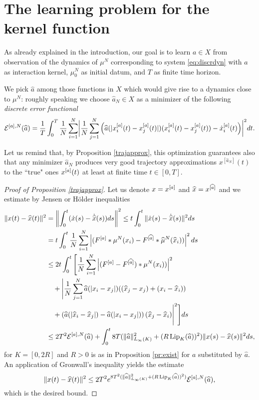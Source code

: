 
\section{The learning problem for the kernel function}\label{sec:learn}

As already explained in the introduction, our goal is to learn $a \in X$ from observation of the dynamics of $\mu^N$ corresponding to system \eqref{eq:discrdyn} with $a$ as interaction kernel, $\mu_0^N$ as initial datum, and $T$ as finite time horizon.

We pick $\widehat a$ among those functions in $X$ which would give rise to a dynamics close to $\mu^N$: roughly speaking we choose $\widehat a_N \in X$ as a minimizer of the following \textit{discrete error functional}
\begin{align}\label{eq-def-error}
	\begin{split}
	\mathcal E^{[a],N}(\widehat a) = \frac{1}{T}\int_0^T\frac{1}{N}\sum_{i=1}^N\biggl|\frac{1}{N}\sum_{j=1}^N
			\left(\widehat a(|x^{[a]}_i(t)-x^{[a]}_j(t)|)(x^{[a]}_i(t) - x^{[a]}_j(t))-\dot{x}^{[a]}_i(t)\right)\biggr|^2 dt.
	\end{split}
\end{align}

Let us remind that, by Proposition \ref{trajapprox}, this optimization guarantees also that any minimizer $\widehat a_N$ produces very good trajectory approximations $x^{[\widehat a_N]}(t)$ to the
``true" ones $x^{[a]}(t)$ at least at finite time $t \in [0,T]$.

\begin{proof}[Proof of Proposition \ref{trajapprox}]
Let us denote $x=x^{[a]} $ and $\widehat x =x^{[\widehat a]}  $ and we estimate by Jensen or H\"older inequalities
\begin{align*}
\|x(t) - \widehat x(t) \|^2 & = \left \| \int_0^t ( \dot x(s) - \dot{\widehat x}(s)) ds \right \|^2 \leq  t \int_0^t \| \dot x(s) - \dot{\widehat x}(s) \|^2 ds \\
&=  t \int_0^t \frac{1}{N} \sum_{i=1}^N \left | (F^{[a]} * \mu^N(x_i)- F^{[\widehat a]} * \widehat \mu^N(\widehat x_i)) \right |^2 ds\\
&\leq 2 t \int_0^t \Bigg[  \frac{1}{N} \sum_{i=1}^N \left| (F^{[a]} - F^{[\widehat a]}) *  \mu^N( x_i)) \right |^2 \\
&\quad +\Bigg| \frac{1}{N} \sum_{j=1}^N \widehat a(|x_i-x_j|)( (\widehat x_j - x_j) + (x_i-\widehat x_i))  \\
&\quad+ \left(\widehat a(| \widehat x_i-\widehat x_j|) -  \widehat a(| x_i- x_j |)\right) (\widehat x_j - \widehat x_i) \Bigg|^2  \Bigg ] ds \\
&\leq 2 T^2 \mathcal E^{[a],N}(\widehat a) +  \int_0^t 8 T( \|\widehat a\|_{L_\infty(K)}^2 + (R \operatorname{Lip}_K(\widehat a) ) ^2 )\|x(s) - \widehat x(s) \|^2  ds,
\end{align*}
for $K=[0,2 R]$ and $R>0$ is as in Proposition \ref{pr:exist} for $a$ substituted by $\widehat a$.
An application of Gronwall's inequality yields the estimate
$$
\|x(t) - \widehat x(t) \|^2 \leq 2 T^2   e^{8 T^2( \|\widehat a\|_{L_\infty(K)}^2 + (R \operatorname{Lip}_K(\widehat a) ) ^2)} \mathcal E^{[a],N}(\widehat a),
$$
which is the desired bound.
\end{proof}


